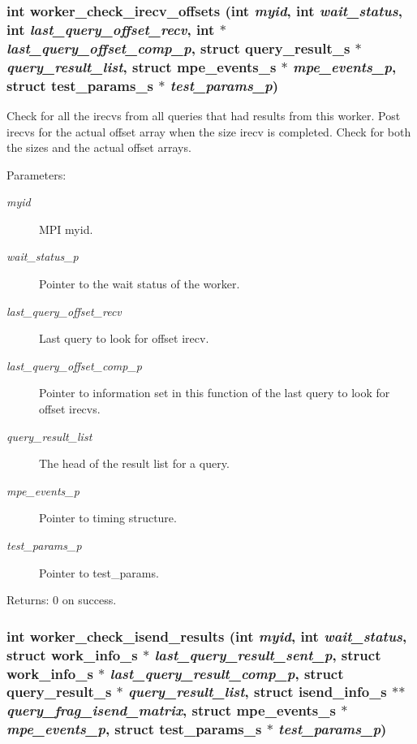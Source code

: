 \subsubsection{\setlength{\rightskip}{0pt plus 5cm}int worker\_\-check\_\-irecv\_\-offsets (int {\em myid}, int {\em wait\_\-status}, int {\em last\_\-query\_\-offset\_\-recv}, int $\ast$ {\em last\_\-query\_\-offset\_\-comp\_\-p}, struct \bf{query\_\-result\_\-s} $\ast$ {\em query\_\-result\_\-list}, struct \bf{mpe\_\-events\_\-s} $\ast$ {\em mpe\_\-events\_\-p}, struct \bf{test\_\-params\_\-s} $\ast$ {\em test\_\-params\_\-p})}\label{worker__help_8h_ff51d5ed7d6274863acfae7518accaa2}


Check for all the irecvs from all queries that had results from this worker. Post irecvs for the actual offset array when the size irecv is completed. Check for both the sizes and the actual offset arrays.

\begin{Desc}
\item[Parameters:]
\begin{description}
\item[{\em myid}]MPI myid. \item[{\em wait\_\-status\_\-p}]Pointer to the wait status of the worker. \item[{\em last\_\-query\_\-offset\_\-recv}]Last query to look for offset irecv.\item[{\em last\_\-query\_\-offset\_\-comp\_\-p}]Pointer to information set in this function of the last query to look for offset irecvs. \item[{\em query\_\-result\_\-list}]The head of the result list for a query. \item[{\em mpe\_\-events\_\-p}]Pointer to timing structure. \item[{\em test\_\-params\_\-p}]Pointer to test\_\-params. \end{description}
\end{Desc}
\begin{Desc}
\item[Returns:]0 on success. \end{Desc}
\subsubsection{\setlength{\rightskip}{0pt plus 5cm}int worker\_\-check\_\-isend\_\-results (int {\em myid}, int {\em wait\_\-status}, struct \bf{work\_\-info\_\-s} $\ast$ {\em last\_\-query\_\-result\_\-sent\_\-p}, struct \bf{work\_\-info\_\-s} $\ast$ {\em last\_\-query\_\-result\_\-comp\_\-p}, struct \bf{query\_\-result\_\-s} $\ast$ {\em query\_\-result\_\-list}, struct \bf{isend\_\-info\_\-s} $\ast$$\ast$ {\em query\_\-frag\_\-isend\_\-matrix}, struct \bf{mpe\_\-events\_\-s} $\ast$ {\em mpe\_\-events\_\-p}, struct \bf{test\_\-params\_\-s} $\ast$ {\em test\_\-params\_\-p})}\label{worker__help_8h_96a210dab5fe40a84b24cada6de7462e}


